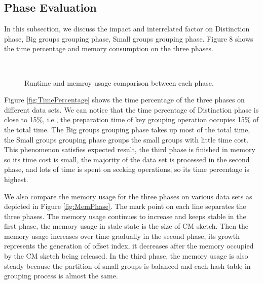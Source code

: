 \subsection{Phase Evaluation}
In this subsection, we discuss the impact and interrelated factor on Distinction phase, Big groups grouping phase, Small groups grouping phase. Figure 8 shows the time percentage and memory consumption on the three phases. 

\begin{figure}[htbp]	
	\label{fig: PhaseEvaluation}
    \hspace{0.23cm}
    \\    
	\caption{Runtime and memroy usage comparison between each phase.}
		
\end{figure}

Figure \ref{fig:TimePercentage} shows the time percentage of the three phases on different data sets. We can notice that the time percentage of Distinction phase is close to 15\%, i.e., the preparation time of key grouping operation occupies 15\% of the total time. The Big groups grouping phase takes up most of the total time, the Small groups grouping phase groups the small groups with little time cost. This phenomenon satisfies expected result, the third phase is finished in memory so its time cost is small, the majority of the data set is processed in the second phase, and lots of time is spent on seeking operations, so its time percentage is highest.

We also compare the memory usage for the three phases on various data sets as depicted in Figure \ref{fig:MemPhase}. The mark point on each line separates the three phases. The memory usage continues to increase and keeps stable in the first phase, the memory usage in stale state is the size of CM sketch. Then the memory usage increases over time gradually in the second phase, its growth represents the generation of offset index, it decreases after the memory occupied by the CM sketch being released. In the third phase, the memory usage is also steady because the partition of small groups is balanced and each hash table in grouping process is almost the same.




